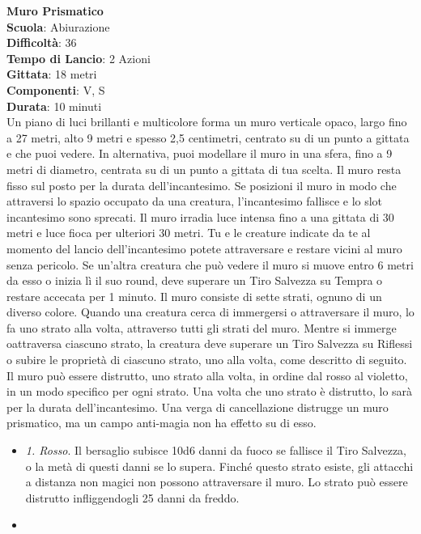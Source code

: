 \begin{multicols}{2}
\medskip\textbf{Muro Prismatico}\\
\textbf{Scuola}: Abiurazione\\
\textbf{Difficoltà}: 36\\
\textbf{Tempo di Lancio}: 2 Azioni\\
\textbf{Gittata}: 18 metri\\
\textbf{Componenti}: V, S\\
\textbf{Durata}: 10 minuti\\
Un piano di luci brillanti e multicolore forma un muro verticale opaco, largo fino a 27 metri, alto 9 metri e spesso 2,5 centimetri, centrato su di un punto a gittata e che puoi vedere. In alternativa, puoi modellare il muro in una sfera, fino a 9 metri di diametro, centrata su di un punto a gittata di tua scelta. Il muro resta fisso sul posto per la durata dell'incantesimo. Se posizioni il muro in modo che attraversi lo spazio occupato da una creatura, l'incantesimo fallisce e lo slot incantesimo sono sprecati. Il muro irradia luce intensa fino a una gittata di 30 metri e luce fioca per ulteriori 30 metri. Tu e le creature indicate da te al momento del lancio dell'incantesimo potete attraversare e restare vicini al muro senza pericolo. Se un'altra creatura che può vedere il muro si muove entro 6 metri da esso o inizia lì il suo round, deve superare un Tiro Salvezza su Tempra o restare accecata per 1 minuto. Il muro consiste di sette strati, ognuno di un diverso colore. Quando una creatura cerca di immergersi o attraversare il muro, lo fa uno strato alla volta, attraverso tutti gli strati del muro. Mentre si immerge oattraversa ciascuno strato, la creatura deve superare un Tiro Salvezza su Riflessi o subire le proprietà di ciascuno strato, uno alla volta, come descritto di seguito.\\
Il muro può essere distrutto, uno strato alla volta, in ordine dal rosso al violetto, in un modo specifico per ogni strato. Una volta che uno strato è distrutto, lo sarà per la durata dell'incantesimo. Una verga di cancellazione distrugge un muro prismatico, ma un campo anti-magia non ha effetto su di esso.
\medskip
\begin{itemize}
\item
\textit{1. Rosso}. Il bersaglio subisce 10d6 danni da fuoco se fallisce il Tiro Salvezza, o la metà di questi danni se lo supera. Finché questo strato esiste, gli attacchi a distanza non magici non possono attraversare il muro. Lo strato può essere distrutto infliggendogli 25 danni da freddo.
\item

\end{itemize}
\end{multicols}
